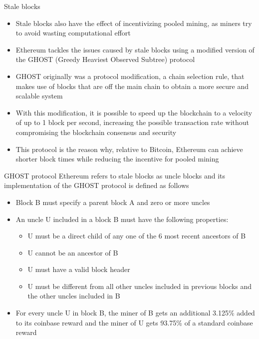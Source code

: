 \documentclass[11pt]{beamer}
\begin{document}

\begin{frame}{Stale blocks}
	\begin{itemize}

		\item Stale blocks also have the effect of incentivizing pooled mining, as miners try to avoid wasting computational effort
		\item Ethereum tackles the issues caused by stale blocks using a modified version of the GHOST (Greedy Heaviest Observed Subtree) protocol
		\item GHOST originally was a protocol modification, a chain selection rule, that makes use of blocks that are off the main chain to obtain a more secure and scalable system
		\item With this modification, it is possible to speed up the blockchain to a velocity of up to 1 block per second, increasing the possible transaction rate without compromising the blockchain consensus and security
		\item This protocol is the reason why, relative to Bitcoin, Ethereum can achieve shorter block times while reducing the incentive for pooled mining
	\end{itemize}
\end{frame}



\begin{frame}{GHOST protocol}
	Ethereum refers to stale blocks as uncle blocks and its implementation of the GHOST protocol is defined as follows
	\begin{itemize}
		\item Block B must specify a parent block A and zero or more uncles
		\item An uncle U included in a block B must have the following properties:
		\begin{itemize}
			\item U must be a direct child of any one of the 6 most recent ancestors of B
			\item U cannot be an ancestor of B
			\item U must have a valid block header
			\item U must be different from all other uncles included in previous blocks and the other uncles included in B
		\end{itemize}
		\item For every uncle U in block B, the miner of B gets an additional 3.125\% added to its coinbase reward and the miner of U gets 93.75\% of a standard coinbase reward
	\end{itemize}
\end{frame}
\end{document}
